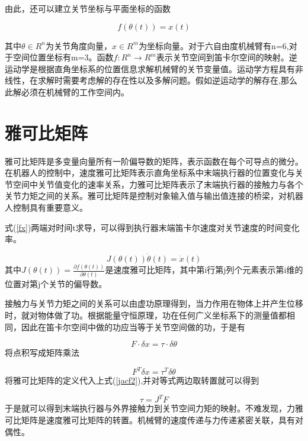\documentclass[12pt,a4paper,openany,oneside]{book}%
\numberwithin{equation}{chapter}%
\numberwithin{figure}{chapter}%
\begin{document}
由此，还可以建立关节坐标与平面坐标的函数\par
\begin{equation}\label{fx}
  f(\theta(t))=x(t)
\end{equation}

其中$\theta\in R^n$为关节角度向量，$x\in R^m$为坐标向量。对于六自由度机械臂有n=6,对于空间位置坐标有m=3。函数$f:R^n\rightarrow R^m$表示关节空间到笛卡尔空间的映射。逆运动学是根据直角坐标系的位置信息求解机械臂的关节变量值。运动学方程具有非线性，在求解时需要考虑解的存在性以及多解问题。假如逆运动学的解存在,那么此解必须在机械臂的工作空间内。\par

\section{雅可比矩阵}
雅可比矩阵是多变量向量所有一阶偏导数的矩阵，表示函数在每个可导点的微分。在机器人的控制中，速度雅可比矩阵表示直角坐标系中末端执行器的位置变化与关节空间中关节值变化的速率关系，力雅可比矩阵表示了末端执行器的接触力与各个关节力矩之间的关系。雅可比矩阵是控制对象输入值与输出值连接的桥梁，对机器人控制具有重要意义。\par
式(\ref{fx})两端对时间t求导，可以得到执行器末端笛卡尔速度对关节速度的时间变化率。\par
\begin{equation}\label{jacv}
  J(\theta(t))\dot{\theta}(t)=\dot{x}(t)
\end{equation}
其中$J(\theta(t))=\frac{\partial f(\theta(t))}{\partial \theta(t)}$是速度雅可比矩阵，其中第i行第j列个元素表示第i维的位置对第j个关节的偏导数。\par
接触力与关节力矩之间的关系可以由虚功原理得到，当力作用在物体上并产生位移时，就对物体做了功。根据能量守恒原理，功在任何广义坐标系下的测量值都相同，因此在笛卡尔空间中做的功应当等于关节空间做的功，于是有\par
\begin{equation}\label{jacf1}
  F·\delta x=\tau ·\delta\theta
\end{equation}
将点积写成矩阵乘法\par
\begin{equation}\label{jacf2}
  F^T\delta x=\tau^T\delta\theta
\end{equation}
将雅可比矩阵的定义代入上式(\ref{jacf2}),并对等式两边取转置就可以得到\par
\begin{equation}\label{jacf3}
  \tau=J^TF
\end{equation}
于是就可以得到末端执行器与外界接触力到关节空间力矩的映射。不难发现，力雅可比矩阵是速度雅可比矩阵的转置。机械臂的速度传递与力传递紧密关联，具有对偶性。
\end{document}
